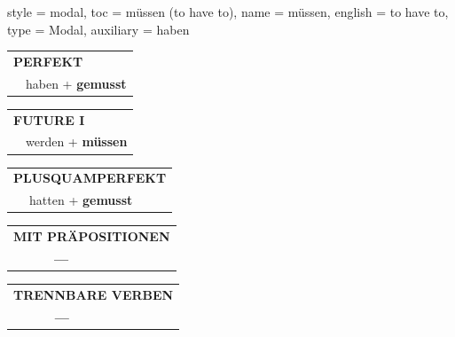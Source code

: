 \begin{verbentry}{
  style = {modal},
  toc = {müssen (to have to)},
  name = {müssen},
  english = {to have to},
  type = {Modal},
  auxiliary = {haben}
}
    \vspace{10pt}
 
    \begin{tabular}{rl}
     \multicolumn{2}{l}{\textbf{PERFEKT}}\\
  &  haben + \textbf{gemusst}\\
  \end{tabular}
\hfill
   \begin{tabular}{rl}
   
    \multicolumn{2}{l}{\textbf{FUTURE I} }\\
  &  werden + \textbf{müssen}\\
 
  \end{tabular}
\hfill
   \begin{tabular}{rl}
      \multicolumn{2}{l}{\textbf{PLUSQUAMPERFEKT}}\\
  &  hatten + \textbf{gemusst}\\
  \end{tabular}
  
  
\vspace{10pt}

\begin{tabular}{lll}
\multicolumn{3}{l}{\textbf{MIT PRÄPOSITIONEN}}\\
& \textbf{---} & \\
\end{tabular}
\hfill
\begin{tabular}{lll}
\multicolumn{3}{l}{\textbf{TRENNBARE VERBEN}}\\
& \textbf{---} & \\
\end{tabular}
\vspace{-5pt}
\end{verbentry}

